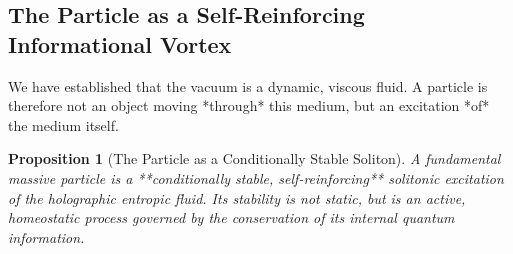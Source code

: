 \documentclass[11pt, letterpaper]{report}
\theoremstyle{plain} %
\newtheorem{proposition}[theorem]{Proposition}
\theoremstyle{definition} %
\theoremstyle{remark} %
\begin{document}
\subsection{The Particle as a Self-Reinforcing Informational Vortex}
\label{subsec:particle_as_vortex}

We have established that the vacuum is a dynamic, viscous fluid. A particle is therefore not an object moving *through* this medium, but an excitation *of* the medium itself.

\begin{proposition}[The Particle as a Conditionally Stable Soliton]
\label{prop:particle_as_soliton_revised}
A fundamental massive particle is a **conditionally stable, self-reinforcing** solitonic excitation of the holographic entropic fluid. Its stability is not static, but is an active, homeostatic process governed by the conservation of its internal quantum information.
\end{proposition}
\end{document}
